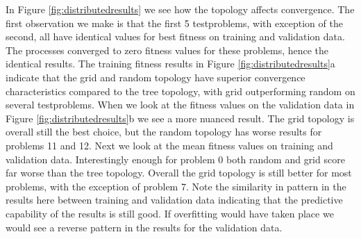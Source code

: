 In Figure \ref{fig:distributedresults} we see how the topology affects convergence. The first observation we make is that the first 5 testproblems, with exception of the second, all have identical values for best fitness on training and validation data. The processes converged to zero fitness values for these problems, hence the identical results. 
The training fitness results in Figure \ref{fig:distributedresults}a indicate that the grid and random topology have superior convergence characteristics compared to the tree topology, with grid outperforming random on several testproblems. When we look at the fitness values on the validation data in Figure \ref{fig:distributedresults}b we see a more nuanced result. The grid topology is overall still the best choice, but the random topology has worse results for problems 11 and 12.
Next we look at the mean fitness values on training and validation data. Interestingly enough for problem 0 both random and grid score far worse than the tree topology. Overall the grid topology is still better for most problems, with the exception of problem 7. Note the similarity in pattern in the results here between training and validation data indicating that the predictive capability of the results is still good. If overfitting would have taken place we would see a reverse pattern in the results for the validation data.



